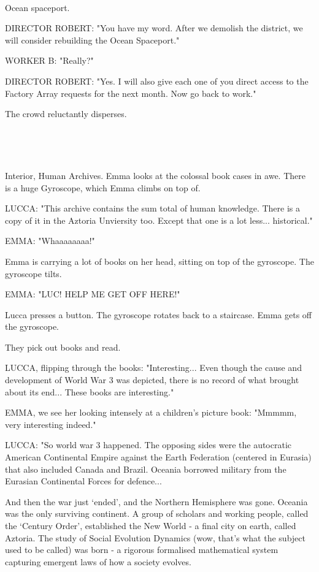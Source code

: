 \documentclass[11pt]{article}
\begin{document}
\ 

Ocean spaceport.

DIRECTOR ROBERT: "You have my word.
After we demolish the district, we will consider rebuilding the Ocean Spaceport."

WORKER B: "Really?"

DIRECTOR ROBERT: "Yes. 
I will also give each one of you direct access to the Factory Array requests for the next month. 
Now go back to work."

The crowd reluctantly disperses.

\ 

\ 

Interior, Human Archives.
Emma looks at the colossal book cases in awe.
There is a huge Gyroscope, which Emma climbs on top of.

LUCCA: "This archive contains the sum total of human knowledge. 
There is a copy of it in the Aztoria Unviersity too.
Except that one is a lot less... historical."

EMMA: "Whaaaaaaaa!"

Emma is carrying a lot of books on her head, sitting on top of the gyroscope. The gyroscope tilts.

EMMA: "LUC! HELP ME GET OFF HERE!"

Lucca presses a button. The gyroscope rotates back to a staircase. 
Emma gets off the gyroscope.

They pick out books and read.

LUCCA, flipping through the books: "Interesting...
Even though the cause and development of World War 3 was depicted, there is no record of what brought about its end...
These books are interesting."

EMMA, we see her looking intensely at a children's picture book: "Mmmmm, very interesting indeed."

LUCCA: "So world war 3 happened. 
The opposing sides were the autocratic American Continental Empire against the Earth Federation (centered in Eurasia) that also included Canada and Brazil.
Oceania borrowed military from the Eurasian Continental Forces for defence...

And then the war just `ended', and the Northern Hemisphere was gone.
Oceania was the only surviving continent.
A group of scholars and working people, called the `Century Order', established the New World - a final city on earth, called Aztoria.
The study of Social Evolution Dynamics (wow, that's what the subject used to be called) was born - a rigorous formalised mathematical system capturing emergent laws of how a society evolves.
\end{document}
